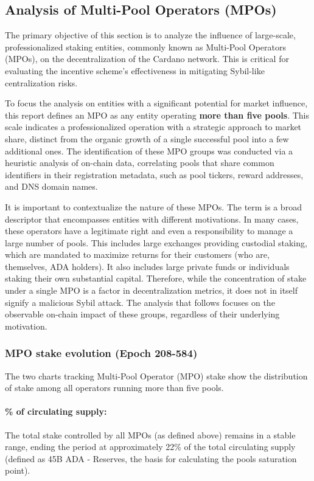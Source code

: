 \documentclass[11pt, letterpaper]{article}
\begin{document}
\subsection{Analysis of Multi-Pool Operators (MPOs)}

The primary objective of this section is to analyze the influence of large-scale,
professionalized staking entities, commonly known as Multi-Pool Operators (MPOs), on
the decentralization of the Cardano network. This is critical for evaluating the incentive
scheme's effectiveness in mitigating Sybil-like centralization risks.

To focus the analysis on entities with a significant potential for market influence,
this report defines an MPO as any entity operating \textbf{more than five pools}. This scale
indicates a professionalized operation with a strategic approach to market share, distinct from the
organic growth of a single successful pool into a few additional ones. The identification of these MPO
groups was conducted via a heuristic analysis of on-chain data, correlating pools that share
common identifiers in their registration metadata, such as pool tickers, reward addresses, and DNS domain names.

It is important to contextualize the nature of these MPOs. The term is a broad descriptor that
encompasses entities with different motivations. In many cases, these operators have a legitimate
right and even a responsibility to manage a large number of pools. This includes large exchanges providing
custodial staking, which are mandated to maximize returns for their customers (who are, themselves, ADA holders).
It also includes large private funds or individuals staking their own substantial capital. Therefore,
while the concentration of stake under a single MPO is a factor in decentralization metrics, it does not
in itself signify a malicious Sybil attack. The analysis that follows focuses on the observable
on-chain impact of these groups, regardless of their underlying motivation.

\newpage
\subsubsection{MPO stake evolution (Epoch 208-584)}

The two charts tracking Multi-Pool Operator (MPO) stake show the distribution
of stake among all operators running more than five pools.

\paragraph{\% of circulating supply:} The total stake controlled by all MPOs (as defined above)
remains in a stable range, ending the period at approximately 22\% of the total circulating
supply (defined as 45B ADA - Reserves, the basis for calculating the pools saturation point).
\end{document}
